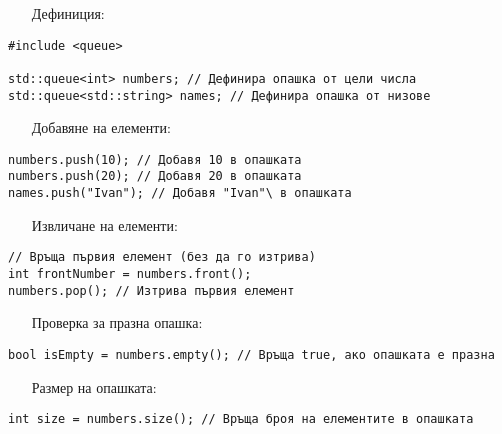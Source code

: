 \documentclass[oneside]{book}
\begin{document}
\begin{itemize}\item[Дефиниция:]\end{itemize}
\begin{mdframed}\begin{lstlisting}
#include <queue>

std::queue<int> numbers; // Дефинира опашка от цели числа
std::queue<std::string> names; // Дефинира опашка от низове
\end{lstlisting}\end{mdframed}
\pagebreak
\begin{itemize}\item[Добавяне] на елементи:\end{itemize}
\begin{mdframed}\begin{lstlisting}
numbers.push(10); // Добавя 10 в опашката
numbers.push(20); // Добавя 20 в опашката
names.push("Ivan"); // Добавя "Ivan"\ в опашката
\end{lstlisting}\end{mdframed}

\begin{itemize}\item[Извличане] на елементи:\end{itemize}
\begin{mdframed}\begin{lstlisting}
// Връща първия елемент (без да го изтрива)
int frontNumber = numbers.front();
numbers.pop(); // Изтрива първия елемент
\end{lstlisting}\end{mdframed}

\begin{itemize}\item[Проверка] за празна опашка:\end{itemize}
\begin{mdframed}\begin{lstlisting}
bool isEmpty = numbers.empty(); // Връща true, ако опашката е празна
\end{lstlisting}\end{mdframed}

\begin{itemize}\item[Размер] на опашката:\end{itemize}
\begin{mdframed}\begin{lstlisting}
int size = numbers.size(); // Връща броя на елементите в опашката
\end{lstlisting}\end{mdframed}
\end{document}
